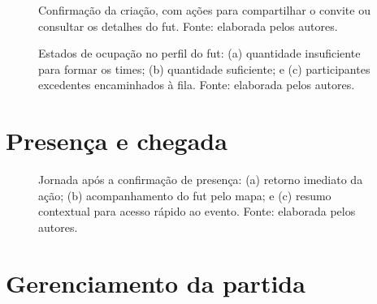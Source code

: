 \begin{apendicesenv}
    \begin{figure}[!htbp]
        \centering
        \caption[Confirmação da criação do fut.]{Confirmação da criação, com ações para compartilhar o convite ou consultar os detalhes do fut. Fonte: elaborada pelos autores.}
        \label{fig:prototipo-fut-criado}
    \end{figure}
    \clearpage

    \begin{figure}[!htbp]
        \centering
        \hfill
        \hfill
        \caption[Estados de ocupação no perfil do fut.]{Estados de ocupação no perfil do fut: (a) quantidade insuficiente para formar os times; (b) quantidade suficiente; e (c) participantes excedentes encaminhados à fila. Fonte: elaborada pelos autores.}
        \label{fig:prototipos-estados-fut}
    \end{figure}
    \clearpage

    \section{Presença e chegada}

    \begin{figure}[!htbp]
        \centering
        \hfill
        \hfill
        \caption[Jornada após a confirmação de presença.]{Jornada após a confirmação de presença: (a) retorno imediato da ação; (b) acompanhamento do fut pelo mapa; e (c) resumo contextual para acesso rápido ao evento. Fonte: elaborada pelos autores.}
        \label{fig:prototipos-presenca}
    \end{figure}
    \clearpage

    \section{Gerenciamento da partida}


\end{apendicesenv}
